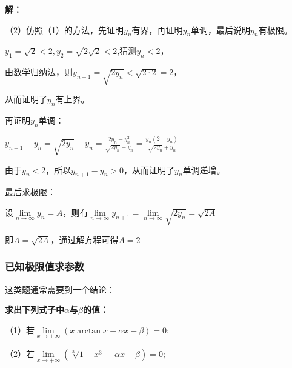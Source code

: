 \documentclass[12pt , a4paper , oneside]{ctexart}
\begin{document}
            \begin{mdframed}
            \textbf{解：}

            （2）仿照（1）的方法，先证明$y_n$有界，再证明$y_n$单调，最后说明$y_n$有极限。

            $y_1=\sqrt{2} < 2,y_2=\sqrt{2\sqrt{2}} < 2$,猜测$y_n < 2$，

            由数学归纳法，则$y_{n+1} = \sqrt{2y_n} < \sqrt{2 \cdot 2} = 2$，

            从而证明了$y_n$有上界。

            再证明$y_n$单调：

            $y_{n+1} - y_n = \sqrt{2y_n} - y_n = \frac{2y_n - y_n^2}{\sqrt{2y_n} + y_n} = \frac{y_n(2-y_n)}{\sqrt{2y_n} + y_n}$

            由于$y_n < 2$，所以$y_{n+1} - y_n > 0$，从而证明了$y_n$单调递增。

            最后求极限：

            设$\lim\limits_{n \to \infty} y_n = A$，则有$\lim\limits_{n \to \infty} y_{n+1} = \lim\limits_{n \to \infty} \sqrt{2y_n} = \sqrt{2A}$

            即$A=\sqrt{2A}$，通过解方程可得$A=2$

            \end{mdframed}

            \subsubsection{已知极限值求参数}
            这类题通常需要到一个结论：

            \begin{center}
            \end{center}

            \textbf{求出下列式子中$\alpha$与$\beta$的值：}

            （1）若$\lim\limits_{x \to +\infty} (x\arctan x - \alpha x - \beta) = 0$;

            （2）若$\lim\limits_{x \to +\infty} (\sqrt[3]{1-x^{3}}-\alpha x - \beta) = 0$;
            
\end{document}
